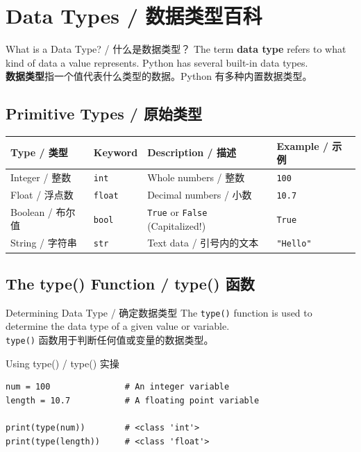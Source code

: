 \documentclass[11pt,a4paper]{report}
\let\oldtexttt\texttt
\renewcommand{\texttt}[1]{\textcolor{mainblue}{\oldtexttt{#1}}}
\begin{document}
\section{Data Types / 数据类型百科}

\begin{concept}{What is a Data Type? / 什么是数据类型？}
    The term \textbf{data type} refers to what kind of data a value represents. Python has several built-in data types. \\
    \textbf{数据类型}指一个值代表什么类型的数据。Python 有多种内置数据类型。
\end{concept}

\subsection{Primitive Types / 原始类型}

\medskip
\centering
\renewcommand{\arraystretch}{1.5}
\begin{tabular}{@{}llll@{}}
\toprule
\textbf{Type / 类型} & \textbf{Keyword} & \textbf{Description / 描述} & \textbf{Example / 示例} \\ \midrule
Integer / 整数 & \texttt{int} & Whole numbers / 整数 & \texttt{100} \\
Float / 浮点数 & \texttt{float} & Decimal numbers / 小数 & \texttt{10.7} \\
Boolean / 布尔值 & \texttt{bool} & \texttt{True} or \texttt{False} (Capitalized!) & \texttt{True} \\
String / 字符串 & \texttt{str} & Text data / 引号内的文本 & \texttt{"Hello"} \\ \bottomrule
\end{tabular}
\medskip

\subsection{The type() Function / type() 函数}

\begin{concept}{Determining Data Type / 确定数据类型}
    The \texttt{type()} function is used to determine the data type of a given value or variable. \\
    \texttt{type()} 函数用于判断任何值或变量的数据类型。
\end{concept}

\begin{examplebox}{Using type() / type() 实操}
\begin{lstlisting}
num = 100               # An integer variable
length = 10.7           # A floating point variable

print(type(num))        # <class 'int'>
print(type(length))     # <class 'float'>
\end{lstlisting}
\end{examplebox}
\end{document}
